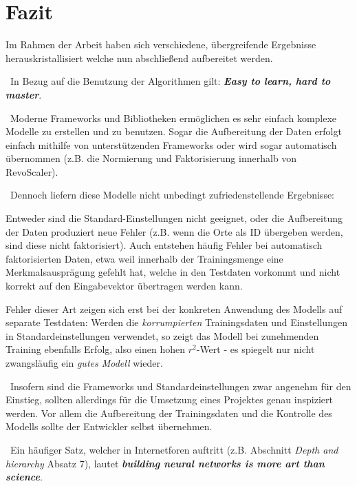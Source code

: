 \chapter{Fazit}
\label{cha:Fazit} \label{cha:Schluss}
Im Rahmen der Arbeit haben sich verschiedene, übergreifende Ergebnisse herauskristallisiert welche nun abschließend aufbereitet werden.

~\newline In Bezug auf die Benutzung der Algorithmen gilt: \textit{\textbf{Easy to learn, hard to master}}. 

~\newline Moderne Frameworks und Bibliotheken ermöglichen es sehr einfach komplexe Modelle zu erstellen und zu benutzen. Sogar die Aufbereitung der Daten erfolgt einfach mithilfe von unterstützenden Frameworks oder wird sogar automatisch übernommen (z.B. die Normierung und Faktorisierung innerhalb von RevoScaler).

~\newline Dennoch liefern diese Modelle nicht unbedingt zufriedenstellende Ergebnisse: 

Entweder sind die Standard-Einstellungen nicht geeignet, oder die Aufbereitung der Daten produziert neue Fehler (z.B. wenn die Orte als ID übergeben werden, sind diese nicht faktorisiert). Auch entstehen häufig Fehler bei automatisch faktorisierten Daten, etwa weil innerhalb der Trainingsmenge eine Merkmalsausprägung gefehlt hat, welche in den Testdaten vorkommt und nicht korrekt auf den Eingabevektor übertragen werden kann. 

Fehler dieser Art zeigen sich erst bei der konkreten Anwendung des Modells auf separate Testdaten: Werden die \textit{korrumpierten} Trainingsdaten und Einstellungen in Standardeinstellungen verwendet, so zeigt das Modell bei zunehmenden Training ebenfalls Erfolg, also einen hohen $r^2$-Wert - es spiegelt nur nicht zwangsläufig ein \textit{gutes Modell} wieder.

~\newline Insofern sind die Frameworks und Standardeinstellungen zwar angenehm für den Einstieg, sollten allerdings für die Umsetzung eines Projektes genau inspiziert werden. Vor allem die Aufbereitung der Trainingsdaten und die Kontrolle des Modells sollte der Entwickler selbst übernehmen.  

~\newline Ein häufiger Satz, welcher in Internetforen auftritt (z.B. \cite{ArtScience} Abschnitt \textit{Depth and hierarchy} Absatz 7), lautet \textit{\textbf{building neural networks is more art than science}}.

